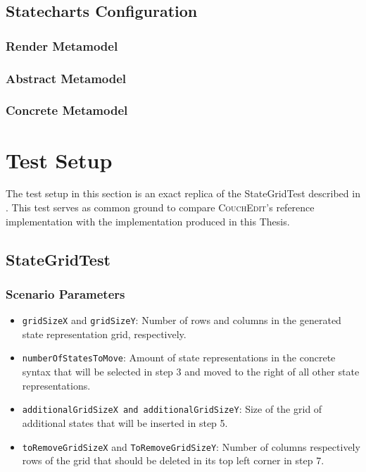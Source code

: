 \newpage
\section{Statecharts Configuration}
\label{app:state}
\subsection*{Render Metamodel}


\subsection*{Abstract Metamodel}


\subsection*{Concrete Metamodel}



\chapter{Test Setup}
\label{app:testsetup}
The test setup in this section is an exact replica of the StateGridTest described in \cite{nachreiner_couchedit_2020}. This test serves as common ground to compare \textsc{CouchEdit}'s reference implementation with the implementation produced in this Thesis.

\section{StateGridTest}
\subsection{Scenario Parameters}

\begin{itemize}
  \item \texttt{gridSizeX} and \texttt{gridSizeY}: Number of rows and columns in the generated state representation grid, respectively.
  \item \texttt{numberOfStatesToMove}: Amount of state representations in the concrete syntax that will be selected in step 3 and moved to the right of all other state representations.
  \item \texttt{additionalGridSizeX and additionalGridSizeY}: Size of the grid of additional states that will be inserted in step 5.
  \item \texttt{toRemoveGridSizeX} and \texttt{ToRemoveGridSizeY}: Number of columns respectively rows of the grid that should be deleted in its top left corner in step 7.
\end{itemize}
